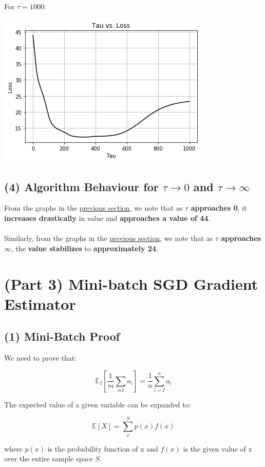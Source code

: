 \documentclass[10pt]{article}
\begin{document}
\pagebreak
For $\tau = 1000$:

\includegraphics[scale=1.0]{1000TauMean.png}

\subsection{(4) Algorithm Behaviour for $\tau \to 0$ and $\tau \to \infty$}

From the graphs in the \hyperref[sec:kfold]{previous section}, we note that as \textbf{$\tau$ approaches 0}, it \textbf{increases drastically} in value and \textbf{approaches a value of 44}.
\\ \\
Similarly, from the graphs in the \hyperref[sec:kfold]{previous section}, we note that as \textbf{$\tau$ approaches $\infty$}, the \textbf{value stabilizes }to \textbf{approximately 24}.


\section{(Part 3) Mini-batch SGD Gradient Estimator}

\subsection{(1) Mini-Batch Proof}
\label{sec:mbp}
We need to prove that: 

\[
\mathbb{E}_{I}[
\frac{1}{m}
\sum_{i \epsilon I}a_{i}]
=
\frac{1}{n}
\sum_{i = I}^{n}a_{i}
\]

The expected value of a given variable can be expanded to: 

\[
\mathbb{E}[X]
=
\sum_{x}^{S}
p(x)f(x)
\]

where $p(x)$ is the probability function of x and $f(x)$ is the given value of x over the entire sample space $S$.
\end{document}
